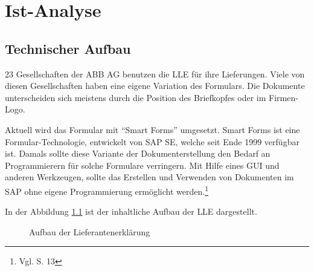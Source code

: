 \chapter{Ist-Analyse}
\label{ch:Ist-Analyse}


	
	\section{Technischer Aufbau}
	\label{ch:ist-aufbau}
	23 Gesellschaften der ABB AG benutzen die \ac{LLE} für ihre Lieferungen. Viele von diesen Gesellschaften haben eine eigene Variation des Formulars. Die Dokumente unterscheiden sich meistens durch die Position des Briefkopfes oder im Firmen-Logo. 
	
	Aktuell wird das Formular mit "`Smart Forms"' umgesetzt. Smart Forms ist eine Formular-Technologie, entwickelt von SAP SE, welche seit Ende 1999 verfügbar ist. Damals sollte diese Variante der Dokumenterstellung den Bedarf an Programmierern für solche Formulare verringern. Mit Hilfe eines \ac{GUI} und anderen Werkzeugen, sollte das Erstellen und Verwenden von Dokumenten im SAP ohne eigene Programmierung ermöglicht werden.\footnote{Vgl. \cite{Hertleif.2003} S. 13}  
	
	In der Abbildung \ref{AufLLE} ist der inhaltliche Aufbau der \ac{LLE} dargestellt. 
	\begin{figure}[ht]
		\centering
		\caption{Aufbau der Lieferantenerklärung}
		\label{AufLLE}
		
	\end{figure}
	
